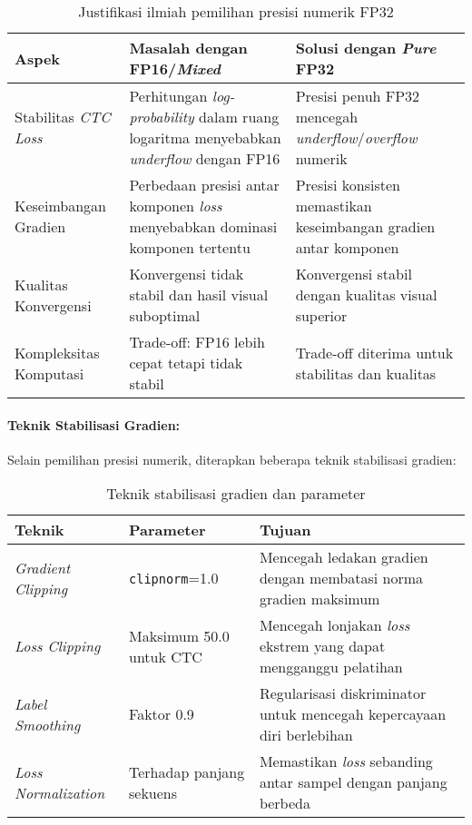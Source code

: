 \documentclass[12pt,a4paper]{article}
\begin{document}
\begin{table}[H]
\centering
\caption{Justifikasi ilmiah pemilihan presisi numerik FP32}
\label{tab:precision-justification}
\small
\begin{tabular}{|p{3.5cm}|p{5cm}|p{5.5cm}|}
\hline
\textbf{Aspek} & \textbf{Masalah dengan FP16/\textit{Mixed}} & \textbf{Solusi dengan \textit{Pure} FP32} \\ \hline
Stabilitas \textit{CTC Loss} & Perhitungan \textit{log-probability} dalam ruang logaritma menyebabkan \textit{underflow} dengan FP16 & Presisi penuh FP32 mencegah \textit{underflow}/\textit{overflow} numerik \\ \hline
Keseimbangan Gradien & Perbedaan presisi antar komponen \textit{loss} menyebabkan dominasi komponen tertentu & Presisi konsisten memastikan keseimbangan gradien antar komponen \\ \hline
Kualitas Konvergensi & Konvergensi tidak stabil dan hasil visual suboptimal & Konvergensi stabil dengan kualitas visual superior \\ \hline
Kompleksitas Komputasi & Trade-off: FP16 lebih cepat tetapi tidak stabil & Trade-off diterima untuk stabilitas dan kualitas \\ \hline
\end{tabular}
\end{table}

\paragraph{Teknik Stabilisasi Gradien:}
Selain pemilihan presisi numerik, diterapkan beberapa teknik stabilisasi gradien:

\begin{table}[H]
\centering
\caption{Teknik stabilisasi gradien dan parameter}
\label{tab:gradient-stabilization}
\small
\begin{tabular}{|l|l|p{6.5cm}|}
\hline
\textbf{Teknik} & \textbf{Parameter} & \textbf{Tujuan} \\ \hline
\textit{Gradient Clipping} & \texttt{clipnorm}=1.0 & Mencegah ledakan gradien dengan membatasi norma gradien maksimum \\ \hline
\textit{Loss Clipping} & Maksimum 50.0 untuk CTC & Mencegah lonjakan \textit{loss} ekstrem yang dapat mengganggu pelatihan \\ \hline
\textit{Label Smoothing} & Faktor 0.9 & Regularisasi diskriminator untuk mencegah kepercayaan diri berlebihan \\ \hline
\textit{Loss Normalization} & Terhadap panjang sekuens & Memastikan \textit{loss} sebanding antar sampel dengan panjang berbeda \\ \hline
\end{tabular}
\end{table}
\end{document}
